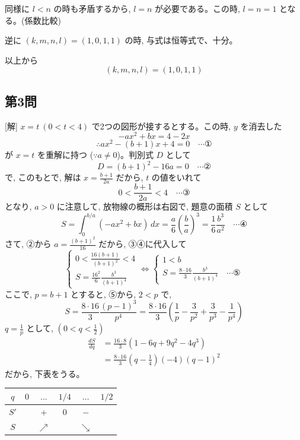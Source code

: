 \documentclass[../main.tex]{subfiles}
\begin{document}
同様に $l < n$ の時も矛盾するから, $l=n$ が必要である。この時, $l=n=1$ となる。(係数比較)

逆に $(k,m,n,l) = (1,0,1,1)$ の時, 与式は恒等式で、十分。

以上から
\[
  (k, m, n, l) = (1,0,1,1)
\]

\subsection*{第3問}

[解] $x=t \ (0 < t < 4)$ で2つの図形が接するとする。この時, $y$ を消去した
\[
  -ax^2 + bx = 4 - 2x
\]
\[
  \therefore ax^2 - (b+1)x + 4 = 0 \quad \cdots \text{①}
\]
が $x=t$ を重解に持つ ($\because a \neq 0$)。判別式 $D$ として
\[
  D = (b+1)^2 - 16a = 0 \quad \cdots \text{②}
\]
で, このもとで, 解は $x = \frac{b+1}{2a}$ だから, $t$ の値をいれて
\[
  0 < \frac{b+1}{2a} < 4 \quad \cdots \text{③}
\]
となり, $a>0$ に注意して, 放物線の概形は右図で, 題意の面積 $S$ として
\[
  S = \int_0^{b/a} (-ax^2+bx) \, dx = \frac{a}{6} \left(\frac{b}{a}\right)^3 = \frac{1}{6} \frac{b^3}{a^2} \quad \cdots \text{④}
\]
さて, ②から $a = \frac{(b+1)^2}{16}$ だから, ③④に代入して
\[
  \begin{cases}
    0 < \frac{16(b+1)}{(b+1)^2} < 4 \\[2mm]
    S = \frac{16^2}{6} \frac{b^3}{(b+1)^4}
  \end{cases}
  \iff
  \begin{cases}
    1 < b \\[2mm]
    S = \frac{8 \cdot 16}{3} \frac{b^3}{(b+1)^4} \quad \cdots \text{⑤}
  \end{cases}
\]
ここで, $p = b+1$ とすると, ⑤から, $2 < p$ で,
\[
  S = \frac{8 \cdot 16}{3} \frac{(p-1)^3}{p^4} = \frac{8 \cdot 16}{3} \left( \frac{1}{p} - \frac{3}{p^2} + \frac{3}{p^3} - \frac{1}{p^4} \right)
\]
$q = \frac{1}{p}$ として, $(0 < q < \frac{1}{2})$
\[
  \begin{aligned}
    \frac{dS}{dq} &= \frac{16 \cdot 8}{3} (1 - 6q + 9q^2 - 4q^3) \\
    &= \frac{8 \cdot 16}{3} \left( q - \frac{1}{4} \right) (-4) (q - 1)^2
  \end{aligned}
\]
だから, 下表をうる。

\begin{center}
  \begin{tabular}{c|c|c|c|c|c}
    $q$ & $0$ & $\dots$ & $1/4$ & $\dots$ & $1/2$ \\ \hline
    $S'$ & & $+$ & $0$ & $-$ & \\ \hline
    $S$ & & $\nearrow$ & & $\searrow$ &
  \end{tabular}
\end{center}
\end{document}
